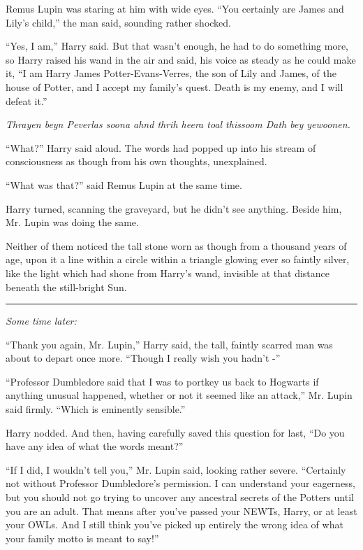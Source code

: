 Remus Lupin was staring at him with wide eyes. ``You certainly are James
and Lily's child,'' the man said, sounding rather shocked.

``Yes, I am,'' Harry said. But that wasn't enough, he had to do
something more, so Harry raised his wand in the air and said, his voice
as steady as he could make it, ``I am Harry James Potter-Evans-Verres,
the son of Lily and James, of the house of Potter, and I accept my
family's quest. Death is my enemy, and I will defeat it.''

\emph{Thrayen beyn Peverlas soona ahnd thrih heera toal thissoom Dath
bey yewoonen.}

``What?'' Harry said aloud. The words had popped up into his stream of
consciousness as though from his own thoughts, unexplained.

``What was that?'' said Remus Lupin at the same time.

Harry turned, scanning the graveyard, but he didn't see anything. Beside
him, Mr. Lupin was doing the same.

Neither of them noticed the tall stone worn as though from a thousand
years of age, upon it a line within a circle within a triangle glowing
ever so faintly silver, like the light which had shone from Harry's
wand, invisible at that distance beneath the still-bright Sun.

\begin{center}\rule{3in}{0.4pt}\end{center}

\emph{Some time later:}

``Thank you again, Mr. Lupin,'' Harry said, the tall, faintly scarred
man was about to depart once more. ``Though I really wish you hadn't -''

``Professor Dumbledore said that I was to portkey us back to Hogwarts if
anything unusual happened, whether or not it seemed like an attack,''
Mr. Lupin said firmly. ``Which is eminently sensible.''

Harry nodded. And then, having carefully saved this question for last,
``Do you have any idea of what the words meant?''

``If I did, I wouldn't tell you,'' Mr. Lupin said, looking rather
severe. ``Certainly not without Professor Dumbledore's permission. I can
understand your eagerness, but you should not go trying to uncover any
ancestral secrets of the Potters until you are an adult. That means
after you've passed your NEWTs, Harry, or at least your OWLs. And I
still think you've picked up entirely the wrong idea of what your family
motto is meant to say!''

